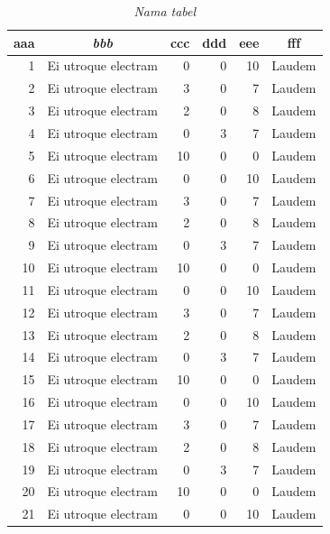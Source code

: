 \begin{small}
\begin{longtable}[c]{|r|l|r|r|r|l|}
\caption{\textit{Nama tabel}} 
\label{tabel-label}\\
\hline
\multicolumn{1}{|c|}{\textbf{aaa}} &
  \multicolumn{1}{c|}{\textit{\textbf{bbb}}} &
  \multicolumn{1}{c|}{\textbf{ccc}} &
  \multicolumn{1}{c|}{\textbf{ddd}} &
  \multicolumn{1}{c|}{\textbf{eee}} &
  \multicolumn{1}{c|}{\textbf{fff}} \\ \hline
\endhead

1   & Ei utroque electram & 0  & 0  & 10 & Laudem  \\ \hline
2   & Ei utroque electram & 3  & 0  & 7  & Laudem  \\ \hline
3   & Ei utroque electram & 2  & 0  & 8  & Laudem  \\ \hline
4   & Ei utroque electram & 0  & 3  & 7  & Laudem  \\ \hline
5   & Ei utroque electram & 10 & 0  & 0  & Laudem  \\ \hline
6   & Ei utroque electram & 0  & 0  & 10 & Laudem  \\ \hline
7   & Ei utroque electram & 3  & 0  & 7  & Laudem  \\ \hline
8   & Ei utroque electram & 2  & 0  & 8  & Laudem  \\ \hline
9   & Ei utroque electram & 0  & 3  & 7  & Laudem  \\ \hline
10   & Ei utroque electram & 10 & 0  & 0  & Laudem  \\ \hline
11   & Ei utroque electram & 0  & 0  & 10 & Laudem  \\ \hline
12   & Ei utroque electram & 3  & 0  & 7  & Laudem  \\ \hline
13   & Ei utroque electram & 2  & 0  & 8  & Laudem  \\ \hline
14   & Ei utroque electram & 0  & 3  & 7  & Laudem  \\ \hline
15   & Ei utroque electram & 10 & 0  & 0  & Laudem  \\ \hline
16   & Ei utroque electram & 0  & 0  & 10 & Laudem  \\ \hline
17   & Ei utroque electram & 3  & 0  & 7  & Laudem  \\ \hline
18   & Ei utroque electram & 2  & 0  & 8  & Laudem  \\ \hline
19   & Ei utroque electram & 0  & 3  & 7  & Laudem  \\ \hline
20   & Ei utroque electram & 10 & 0  & 0  & Laudem  \\ \hline
21   & Ei utroque electram & 0  & 0  & 10 & Laudem  \\ \hline

\end{longtable}
\end{small}
